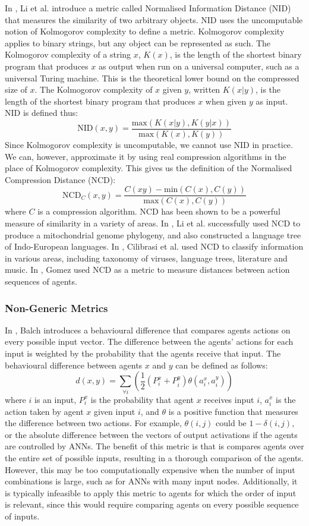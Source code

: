 \documentclass[12pt]{article} %
\begin{document}
In \cite{Li2004}, Li et al. introduce a metric called Normalised Information Distance (NID) that measures the similarity of two arbitrary objects. NID uses the uncomputable notion of Kolmogorov complexity to define a metric. Kolmogorov complexity applies to binary strings, but any object can be represented as such. The Kolmogorov complexity of a string $x$, $K(x)$, is the length of the shortest binary program that produces $x$ as output when run on a universal computer, such as a universal Turing machine. This is the theoretical lower bound on the compressed size of $x$. The Kolmogorov complexity of $x$ given $y$, written $K(x|y)$, is the length of the shortest binary program that produces $x$ when given $y$ as input. NID is defined thus:
\[
\text{NID}(x,y) = \frac{\text{max}(K(x|y), K(y|x))}{\text{max}(K(x), K(y))}
\]
Since Kolmogorov complexity is uncomputable, we cannot use NID in practice. We can, however, approximate it by using real compression algorithms in the place of Kolmogorov complexity. This gives us the definition of the Normalised Compression Distance (NCD):
\[
\text{NCD}_C(x,y) = \frac{C(xy) - \text{min}(C(x), C(y))}{\text{max}(C(x),C(y))}
\]
where $C$ is a compression algorithm. NCD has been shown to be a powerful measure of similarity in a variety of areas. In \cite{Li2004}, Li et al. successfully used NCD to produce a mitochondrial genome phylogeny, and also constructed a language tree of Indo-European languages. In \cite{Cilibrasi2005}, Cilibrasi et al. used NCD to classify information in various areas, including taxonomy of viruses, language trees, literature and music. In \cite{Gomez2009}, Gomez used NCD as a metric to measure distances between action sequences of agents.

\subsubsection{Non-Generic Metrics}

In \cite{Balch1997}, Balch introduces a behavioural difference that compares agents actions on every possible input vector. The difference between the agents' actions for each input is weighted by the probability that the agents receive that input. The behavioural difference between agents $x$ and $y$ can be defined as follows:
\[
d(x,y) = \displaystyle\sum\limits_{\forall i}\left(\frac{1}{2}(P_i^x + P_i^y)\theta(a_i^x,a_i^y)\right)
\]
where $i$ is an input, $P_i^x$ is the probability that agent $x$ receives input $i$, $a_i^x$ is the action taken by agent $x$ given input $i$, and $\theta$ is a positive function that measures the difference between two actions. For example, $\theta(i,j)$ could be $1 - \delta(i,j)$, or the absolute difference between the vectors of output activations if the agents are controlled by ANNs. The benefit of this metric is that is compares agents over the entire set of possible inputs, resulting in a thorough comparison of the agents. However, this may be too computationally expensive when the number of input combinations is large, such as for ANNs with many input nodes. Additionally, it is typically infeasible to apply this metric to agents for which the order of input is relevant, since this would require comparing agents on every possible sequence of inputs.
\end{document}
